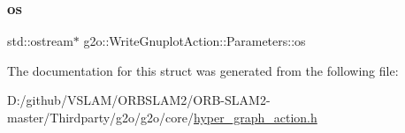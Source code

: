 \subsubsection{\texorpdfstring{os}{os}}
{\footnotesize\ttfamily std\+::ostream$\ast$ g2o\+::\+Write\+Gnuplot\+Action\+::\+Parameters\+::os}



The documentation for this struct was generated from the following file\+:\begin{DoxyCompactItemize}
\item 
D\+:/github/\+V\+S\+L\+A\+M/\+O\+R\+B\+S\+L\+A\+M2/\+O\+R\+B-\/\+S\+L\+A\+M2-\/master/\+Thirdparty/g2o/g2o/core/\mbox{\hyperlink{hyper__graph__action_8h}{hyper\+\_\+graph\+\_\+action.\+h}}\end{DoxyCompactItemize}
